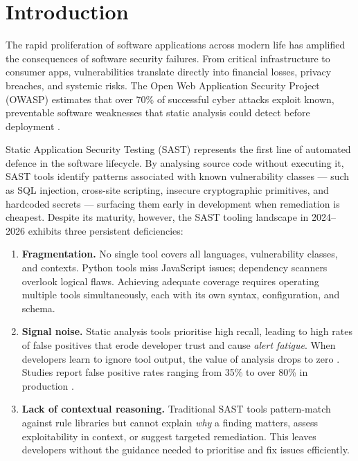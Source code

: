 \chapter{Introduction}
\label{ch:intro}


The rapid proliferation of software applications across modern life has amplified the consequences of software security failures. From critical infrastructure to consumer apps, vulnerabilities translate directly into financial losses, privacy breaches, and systemic risks. The Open Web Application Security Project (OWASP) estimates that over 70\% of successful cyber attacks exploit known, preventable software weaknesses that static analysis could detect before deployment \cite{owasp_top10_2021}.

Static Application Security Testing (SAST) represents the first line of automated defence in the software lifecycle. By analysing source code without executing it, SAST tools identify patterns associated with known vulnerability classes --- such as SQL injection, cross-site scripting, insecure cryptographic primitives, and hardcoded secrets --- surfacing them early in development when remediation is cheapest. Despite its maturity, however, the SAST tooling landscape in 2024--2026 exhibits three persistent deficiencies:

\begin{enumerate}
  \item \textbf{Fragmentation.} No single tool covers all languages, vulnerability classes, and contexts. Python tools miss JavaScript issues; dependency scanners overlook logical flaws. Achieving adequate coverage requires operating multiple tools simultaneously, each with its own syntax, configuration, and schema.

  \item \textbf{Signal noise.} Static analysis tools prioritise high recall, leading to high rates of false positives that erode developer trust and cause \textit{alert fatigue}. When developers learn to ignore tool output, the value of analysis drops to zero \cite{johnson2013dont}. Studies report false positive rates ranging from 35\% to over 80\% in production \cite{muske2016survey}.

  \item \textbf{Lack of contextual reasoning.} Traditional SAST tools pattern-match against rule libraries but cannot explain \textit{why} a finding matters, assess exploitability in context, or suggest targeted remediation. This leaves developers without the guidance needed to prioritise and fix issues efficiently.
\end{enumerate}


